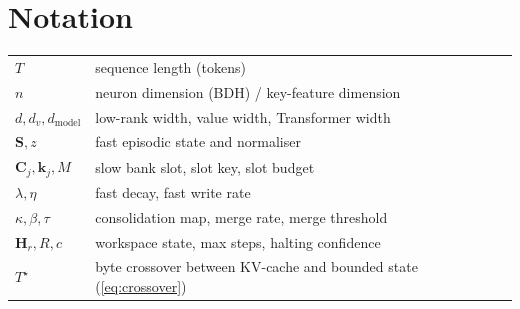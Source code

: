 \documentclass[11pt]{article}
\theoremstyle{remark}
\newcommand{\Sm}{\mathbf{S}}
\newcommand{\Cm}{\mathbf{C}}
\newcommand{\Hm}{\mathbf{H}}
\begin{document}
\section{Notation}
\begin{tabular}{@{}ll@{}}
$T$ & sequence length (tokens)\\
$n$ & neuron dimension (BDH) / key-feature dimension\\
$d,d_v,d_{\text{model}}$ & low-rank width, value width, Transformer width\\
$\Sm,z$ & fast episodic state and normaliser\\
$\Cm_j,\mathbf{k}_j,M$ & slow bank slot, slot key, slot budget\\
$\lambda,\eta$ & fast decay, fast write rate\\
$\kappa,\beta,\tau$ & consolidation map, merge rate, merge threshold\\
$\Hm_r,R,c$ & workspace state, max steps, halting confidence\\
$T^\star$ & byte crossover between KV-cache and bounded state (\cref{eq:crossover})\\
\end{tabular}
\end{document}
